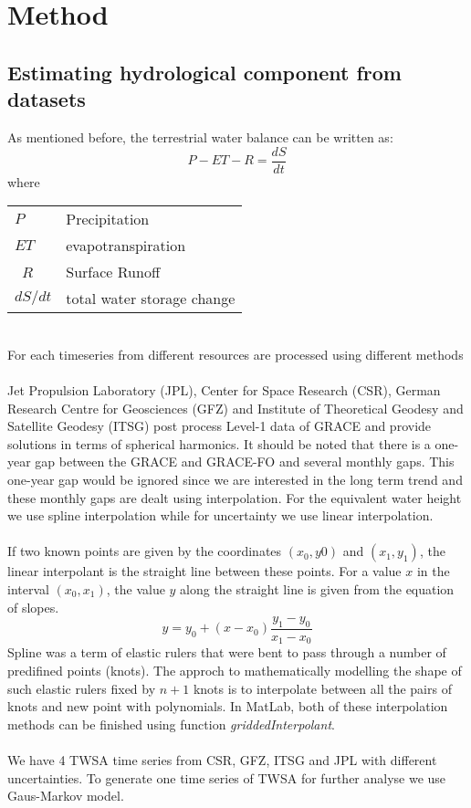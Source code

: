 \chapter{Method}
\section{Estimating hydrological component from datasets}\label{section:combine}
As mentioned before, the terrestrial water balance can be written as:
\begin{equation}
P - ET - R = \frac{dS}{dt}
\end{equation}
where
\begin{table}[htbp]
	\begin{tabular}{ll}
		$P$   & Precipitation    \\ 
		$ET$    & evapotranspiration \\ \
		$R$     & Surface Runoff \\ 
		$dS / dt$ & total water storage change \\ 
	\end{tabular}
\end{table}\\
For each timeseries from different resources are processed using different methods\\\\
 Jet Propulsion Laboratory (JPL), Center for Space Research (CSR), German Research Centre for Geosciences (GFZ) and Institute of Theoretical Geodesy and Satellite Geodesy (ITSG)  post process Level-1 data of GRACE and provide solutions in terms of spherical harmonics. It should be noted that there is a one-year gap between the GRACE and GRACE-FO and several monthly gaps. This one-year gap would be ignored since we are interested in the long term trend and these monthly gaps are dealt using interpolation. For the equivalent water height we use spline interpolation while for uncertainty we use linear interpolation.\\\\
If two known points are given by the coordinates $(x_0,y0)$ and $(x_1,y_1)$, the linear interpolant is the straight line between these points. For a value $x$ in the interval $(x_0,x_1)$, the value $y$ along the straight line is given from the equation of slopes.
\begin{equation}
	y = y_0 + (x-x_0)\frac{y_1-y_0}{x_1-x_0}
\end{equation}
Spline was a term of elastic rulers that were bent to pass through a number of predifined points (knots). The approch to mathematically modelling the shape of such elastic rulers fixed by $n+1$ knots is to interpolate between all the pairs of knots and new point with polynomials. In MatLab, both of these interpolation methods can be finished using function \textit{griddedInterpolant}.\\\\
We have 4 TWSA time series from CSR, GFZ, ITSG and JPL with different uncertainties. To generate one time series of TWSA for further analyse we use Gaus-Markov model.
